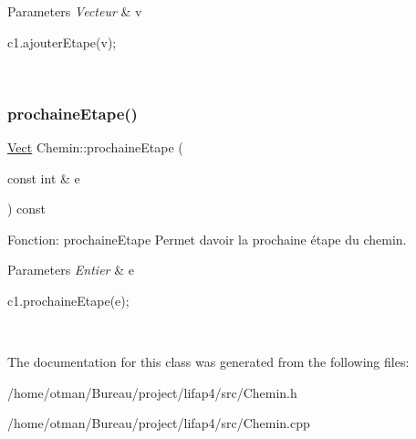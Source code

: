 \begin{DoxyParams}{Parameters}
{\em Vecteur} & v 
\begin{DoxyCode}
c1.ajouterEtape(v);
\end{DoxyCode}
 \\
\hline
\end{DoxyParams}
\mbox{\label{classChemin_ad01a7ae60fd0b51cc18281c031ea9c97}} 
\subsubsection{\texorpdfstring{prochaine\+Etape()}{prochaineEtape()}}
{\footnotesize\ttfamily \hyperlink{classVect}{Vect} Chemin\+::prochaine\+Etape (\begin{DoxyParamCaption}\item[{const int \&}]{e }\end{DoxyParamCaption}) const}



Fonction\+: prochaine\+Etape Permet d\textquotesingle{}avoir la prochaine étape du chemin. 


\begin{DoxyParams}{Parameters}
{\em Entier} & e 
\begin{DoxyCode}
c1.prochaineEtape(e);
\end{DoxyCode}
 \\
\hline
\end{DoxyParams}


The documentation for this class was generated from the following files\+:\begin{DoxyCompactItemize}
\item 
/home/otman/\+Bureau/project/lifap4/src/Chemin.\+h\item 
/home/otman/\+Bureau/project/lifap4/src/Chemin.\+cpp\end{DoxyCompactItemize}
